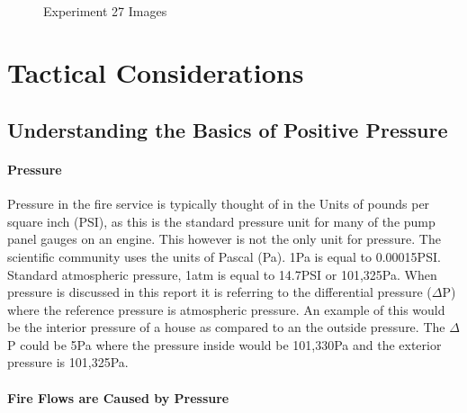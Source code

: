 \documentclass{article}
\begin{document}
\begin{figure}[H]
	\ContinuedFloat 
	\centering 
	 \ 
	\caption{Experiment 27 Images}
	\label{fig:Experiment31ImagesCont4} 
\end{figure}

\clearpage

\section{Tactical Considerations}

\subsection{Understanding the Basics of Positive Pressure}

\paragraph{Pressure} \mbox{}

Pressure in the fire service is typically thought of in the Units of pounds per square inch (PSI), as this is the standard pressure unit for many of the pump panel gauges on an engine. This however is not the only unit for pressure. The scientific community uses the units of Pascal (Pa).  1Pa is equal to 0.00015PSI. Standard atmospheric pressure, 1atm  is equal to 14.7PSI or 101,325Pa. When pressure is discussed in this report it is referring to the differential pressure ($\Delta$P) where the reference pressure is atmospheric pressure. An example of this would be the interior pressure of a house as compared to an the outside pressure. The $\Delta$P could be 5Pa where the pressure inside would be 101,330Pa and the exterior pressure is 101,325Pa.  

\paragraph{Fire Flows are Caused by Pressure} \mbox{}
\end{document}
